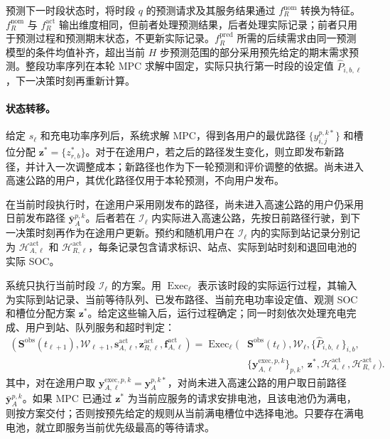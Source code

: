 \documentclass[12pt,a4paper,UTF8]{ctexart}
\begin{document}
预测下一时段状态时，将时段 $q$ 的预测请求及其服务结果通过 $f_R^{\mathrm{nom}}$ 转换为特征。$f_R^{\mathrm{nom}}$ 与 $f_R^{\mathrm{act}}$ 输出维度相同，但前者处理预测结果，后者处理实际记录；前者只用于预测过程和预测期末状态，不更新实际记录。$f_R^{\mathrm{pred}}$ 所需的后续需求由同一预测模型的条件均值补齐，超出当前 $H$ 步预测范围的部分采用预先给定的期末需求预测。整段功率序列在本轮 MPC 求解中固定，实际只执行第一时段的设定值 $\widehat P_{i,b,\ell}$，下一决策时刻再重新计算。

\paragraph{状态转移。}
给定 $s_\ell$ 和充电功率序列后，系统求解 MPC，得到各用户的最优路径
$\{y_{i,j}^{p,k*}\}$ 和槽位分配 $\mathbf z^*=\{z_{r,b}^*\}$。对于在途用户，若之后的路径发生变化，则立即发布新路径，并计入一次调整成本；新路径也作为下一轮预测和评价调整的依据。尚未进入高速公路的用户，其优化路径仅用于本轮预测，不向用户发布。

在当前时段执行时，在途用户采用刚发布的路径，尚未进入高速公路的用户仍采用日前发布路径 $\bar{\mathbf y}_{A}^{p,k}$。后者若在 $\mathcal I_\ell$ 内实际进入高速公路，先按日前路径行驶，到下一决策时刻再作为在途用户更新。预约和随机用户在 $\mathcal I_\ell$ 内的实际到站记录分别记为 $\mathcal H_{A,\ell}^{\mathrm{act}}$ 和 $\mathcal H_{R,\ell}^{\mathrm{act}}$，每条记录包含请求标识、站点、实际到站时刻和退回电池的实际 SOC。

系统只执行当前时段 $\mathcal I_\ell$ 的方案。用 $\operatorname{Exec}_\ell$ 表示该时段的实际运行过程，其输入为实际到站记录、当前等待队列、已发布路径、当前充电功率设定值、观测 SOC 和槽位分配方案 $\mathbf z^*$。给定这些输入后，运行过程确定；同一时刻依次处理充电完成、用户到站、队列服务和超时判定：
\begin{equation}
\begin{aligned}
(\mathbf S^{\mathrm{obs}}(t_{\ell+1}),\mathcal W_{\ell+1},
\mathbf s_{A,\ell}^{\mathrm{act}},\mathbf z_{R,\ell}^{\mathrm{act}},
\mathbf f_{A,\ell}^{\mathrm{act}})
=\operatorname{Exec}_\ell\!\Big(&
\mathbf S^{\mathrm{obs}}(t_\ell),\mathcal W_\ell,
\{\widehat P_{i,b,\ell}\}_{i,b},\\
&\{\mathbf y_{A,\ell}^{\mathrm{exec},p,k}\}_{p,k},\ \mathbf z^*,
\mathcal H_{A,\ell}^{\mathrm{act}},\mathcal H_{R,\ell}^{\mathrm{act}}
\Big).
\end{aligned}
\label{eq:actual_execution_operator}
\end{equation}
其中，对在途用户取 $\mathbf y_{A,\ell}^{\mathrm{exec},p,k}=\mathbf y_A^{p,k*}$，对尚未进入高速公路的用户取日前路径 $\bar{\mathbf y}_{A}^{p,k}$。如果 MPC 已通过 $\mathbf z^*$ 为当前应服务的请求安排电池，且该电池仍为满电，则按方案交付；否则按预先给定的规则从当前满电槽位中选择电池。只要存在满电电池，就立即服务当前优先级最高的等待请求。
\end{document}
